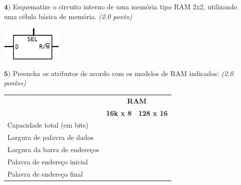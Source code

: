 \documentclass[12pt]{article}
\newcommand{\exerc}[3]{ \vspace*{25pt} {$\mathbf{#1)}$} #2 \hfill {\it #3} }
\begin{document}
\vspace{-20pt}
\exerc{4}{Esquematize o circuito interno de uma memória tipo RAM 2x2,
  utilizando uma célula básica de memória.}{(2.0 ponto)}
  \begin{center}
    \includegraphics[width=30mm]{mem}
  \end{center}


\exerc{5}{Preencha os atributos de acordo com os modelos de RAM indicados:}{(2.0 pontos)}
\\
\begin{center}
\begin{tabular}{|l|c|c|}
 \cline{2-3}
 \multicolumn{1}{c|}{} & \multicolumn{2}{c|}{\bf RAM} \\ \cline{2-3}
 \multicolumn{1}{c|}{} & {\bf 16k x 8} & {\bf 128 x 16} \\ \hline
 Capacidade total (em bits) & \phantom{aaaaaaaaaaaaaa} & \phantom{aaaaaaaaaaaaaa} \\ \hline
 Largura de palavra de dados & & \\ \hline
 Largura da barra de endereços & & \\ \hline
 Palavra de endereço inicial & & \\ \hline
 Palavra de endereço final & & \\ \hline
\end{tabular}
\end{center}
\end{document}
